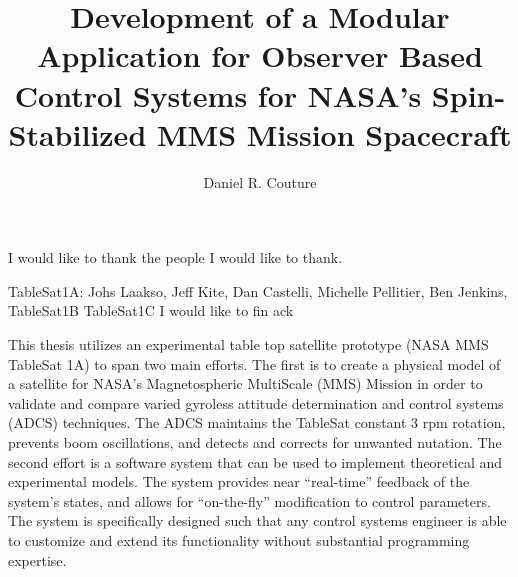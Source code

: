 \documentclass[11pt,doublespace]{unhthesis}
\begin{document}
\title{Development of a Modular Application for Observer Based Control Systems for NASA's Spin-Stabilized MMS Mission Spacecraft}
\author{Daniel R. Couture}
\maketitle

\makecopyright

\makeapproval

\begin{dedication}
  I would like to thank the people I would like to thank.
\end{dedication}

\begin{acknowledgments}
  TableSat1A: Johs Laakso, Jeff Kite, Dan Castelli, Michelle Pellitier, Ben Jenkins,
  TableSat1B
  TableSat1C
    I would like to fin ack
\end{acknowledgments}

\begin{singlespace}
  \tableofcontents
  \listoftables
  \listoffigures
\end{singlespace}

\begin{abstractpage}
This thesis utilizes an experimental table top satellite prototype (NASA MMS TableSat 1A) to span two main efforts.  The first is to create a physical model of a satellite for NASA's Magnetospheric MultiScale (MMS) Mission in order to validate and compare varied gyroless attitude determination and control systems (ADCS) techniques.  The ADCS maintains the TableSat constant 3 rpm rotation, prevents boom oscillations, and detects and corrects for unwanted nutation.  The second effort is a software system that can be used to implement theoretical and experimental models.  The system provides near ``real-time'' feedback of the system's states, and allows for ``on-the-fly'' modification to control parameters.  The system is specifically designed such that any control systems engineer is able to customize and extend its functionality without substantial programming expertise.
\end{abstractpage}
\end{document}
